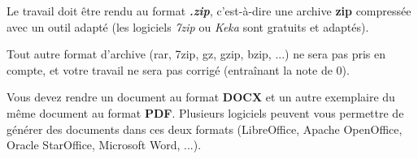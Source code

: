 


\noindent Le travail doit être rendu au format \textbf{\textit{.zip}}, c'est-à-dire une archive \textbf{zip} compressée avec un outil adapté (les logiciels \textit{7zip} ou \textit{Keka} sont gratuits et adaptés).

\noindent Tout autre format d'archive (rar, 7zip, gz, gzip, bzip, ...) ne sera pas pris en compte, et votre travail ne sera pas corrigé (entraînant la note de 0).

\vspace*{1cm}

\noindent Vous devez rendre un document au format \textbf{DOCX} et un autre exemplaire du même document au format \textbf{PDF}. Plusieurs logiciels peuvent vous permettre de générer des documents dans ces deux formats (LibreOffice, Apache OpenOffice, Oracle StarOffice, Microsoft Word, ...).
